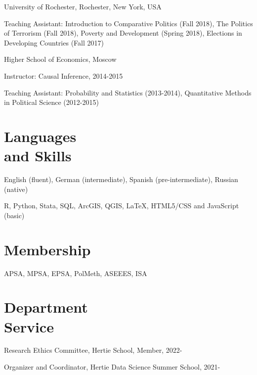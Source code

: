 \documentclass[margin,line,10.95pt]{res}
\newenvironment{list1}{
  \begin{list}{\ding{113}}{%
      \setlength{\itemsep}{0in}
      \setlength{\parsep}{0in} \setlength{\parskip}{0in}
      \setlength{\topsep}{0in} \setlength{\partopsep}{0in}
      \setlength{\leftmargin}{0.17in}}}{\end{list}}
\begin{document}
\begin{resume}
{University of Rochester}, Rochester, New York, USA\\
\vspace*{-.1in}
\begin{list1}
\item[] Teaching Assistant: Introduction to Comparative Politics (Fall 2018),  The Politics of Terrorism (Fall 2018), Poverty and Development (Spring 2018), Elections in Developing Countries (Fall 2017) 
\end{list1}

\vspace{-3mm}
{Higher School of Economics, Moscow}\\
\vspace*{-.1in}
\begin{list1}
	\item[] Instructor: Causal Inference, 2014-2015
	\item[] Teaching Assistant: Probability and Statistics (2013-2014), Quantitative Methods in Political Science (2012-2015)
\end{list1}

\section{\sc Languages \\ and Skills}
English (fluent), German (intermediate), Spanish (pre-intermediate), Russian (native)
\vspace*{-4.5mm}

R, Python, Stata, SQL, ArcGIS, QGIS, \LaTeX , HTML5/CSS and JavaScript (basic) 
\vspace*{-2.5mm}

\section{\sc Membership}

APSA, MPSA, EPSA, PolMeth, ASEEES, ISA

\section{\sc Department \\ Service}

Research Ethics Committee, Hertie School, Member, 2022-
\vspace*{-4.5mm}

Organizer and Coordinator, Hertie Data Science Summer School, 2021-
\vspace*{-4.5mm}


\end{resume}
\end{document}

